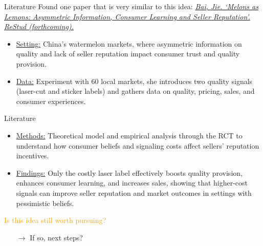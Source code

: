 \documentclass[12pt, aspectratio=169]{beamer}
\begin{document}
\begin{frame}[noframenumbering] {Literature}
\small
Found one paper that is very similar to this idea: \textit{\href{https://drive.google.com/file/d/0B52sohAPtnAWYVhBYm11cDBrSmM/view?resourcekey=0-R4YuMEKjedEfvJNhMFWLKg}{Bai, Jie. `Melons as Lemons: Asymmetric Information, Consumer Learning and Seller Reputation'. ReStud (forthcoming).}} 
\begin{itemize}
 \item \ul{Setting:} China’s watermelon markets, where asymmetric information on quality and lack of seller reputation impact consumer trust and quality provision.

 \item \ul{Data:} Experiment with 60 local markets, she introduces two quality signals (laser-cut and sticker labels) and gathers data on quality, pricing, sales, and consumer experiences.


\end{itemize}
\end{frame}

\begin{frame} [noframenumbering] {Literature}
\small
\begin{itemize}
\item \ul{Methods:} Theoretical model and empirical analysis through the RCT to understand how consumer beliefs and signaling costs affect sellers' reputation incentives.
\item \ul{Findings:} Only the costly laser label effectively boosts quality provision, enhances consumer learning, and increases sales, showing that higher-cost signals can improve seller reputation and market outcomes in settings with pessimistic beliefs.

\end{itemize}
\end{frame}

\begin{frame}{}
\textcolor{orange}{Is this idea still worth pursuing?}
\begin{itemize}
    \item [$\rightarrow$] If so, next steps?
\end{itemize}
\end{frame}
\end{document}
